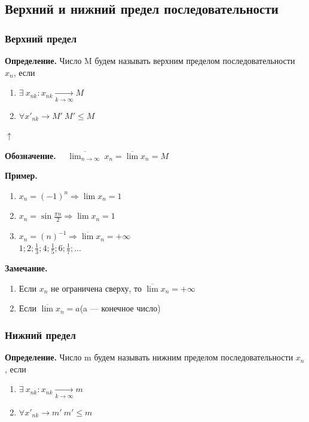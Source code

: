 \documentclass{article}
\begin{document}
    \subsection{Верхний и нижний предел последовательности}
    \subsubsection{Верхний предел}
    \textbf{Определение.} Число M будем называть верхним пределом последовательности \(x_n\), если
    \begin{enumerate}
        \item \( \exists\ x_{nk}: x_{nk}  \xrightarrow[k \rightarrow \infty]{} M\)
    
        \item \(\forall x'_{nk} \rightarrow M'\ M' \leq M\)

    \end{enumerate}
    \( \uparrow \)

    \textbf{Обозначение.} \(\quad \overline{\lim_{n \rightarrow \infty}}\ x_n = \overline{\lim} x_n = M \)

    \textbf{Пример.}
    \begin{enumerate}
        \item \(x_n = (-1)^n \Rightarrow \lim{x_n} = 1\)
        
        \item \(x_n = \sin{\frac{\pi n}{2}} \Rightarrow \lim{x_n} = 1\)
    
        \item \(x_n = (n)^{-1} \Rightarrow \overline{\lim}x_n = +\infty\)\\
        \( 1; 2; \frac{1}{3}; 4; \frac{1}{5}; 6; \frac{1}{7}; ... \)
    \end{enumerate}
    
    \textbf{Замечание.} 
    \begin{enumerate}
        \item Если \(x_n\) не ограничена сверху, то \(\overline{\lim}x_n = +\infty\)
        
        \item Если \(\overline{\lim}x_n = a\)(a --- конечное число)
    \end{enumerate}
    \subsubsection{Нижний предел}
    \textbf{Определение.} Число m будем называть нижним пределом последовательности \(x_n\), если
    \begin{enumerate}
        \item \( \exists\ x_{nk}: x_{nk}  \xrightarrow[k \rightarrow \infty]{} m\)
    
        \item \(\forall x'_{nk} \rightarrow m'\ m' \leq m\)

    \end{enumerate}
\end{document}
